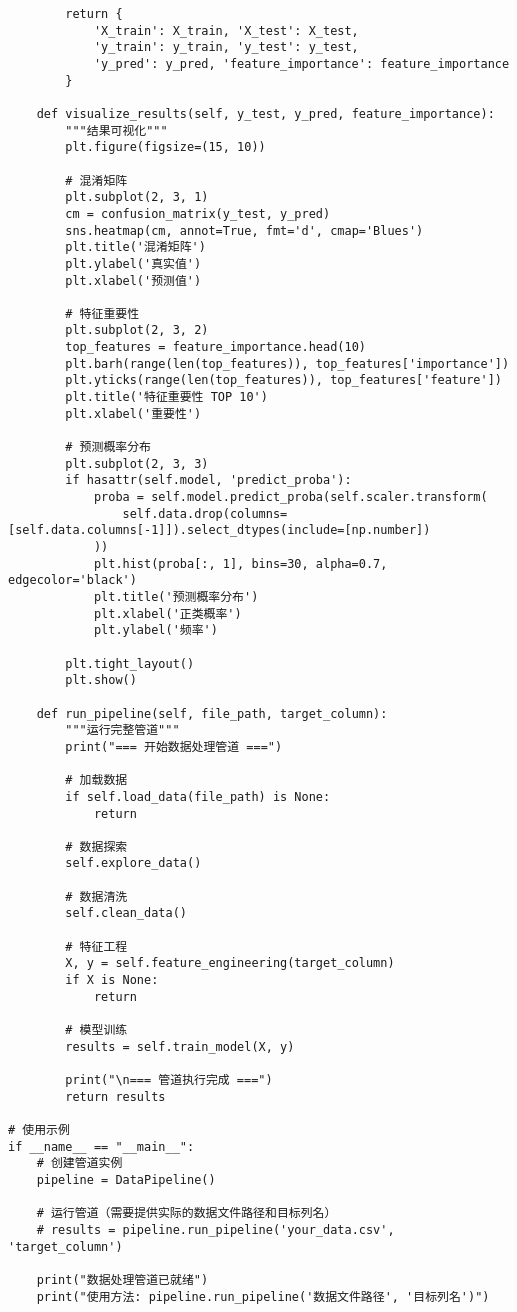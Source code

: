 \begin{codebox}[title=数据处理管道实现]
\begin{verbatim}
        return {
            'X_train': X_train, 'X_test': X_test,
            'y_train': y_train, 'y_test': y_test,
            'y_pred': y_pred, 'feature_importance': feature_importance
        }
    
    def visualize_results(self, y_test, y_pred, feature_importance):
        """结果可视化"""
        plt.figure(figsize=(15, 10))
        
        # 混淆矩阵
        plt.subplot(2, 3, 1)
        cm = confusion_matrix(y_test, y_pred)
        sns.heatmap(cm, annot=True, fmt='d', cmap='Blues')
        plt.title('混淆矩阵')
        plt.ylabel('真实值')
        plt.xlabel('预测值')
        
        # 特征重要性
        plt.subplot(2, 3, 2)
        top_features = feature_importance.head(10)
        plt.barh(range(len(top_features)), top_features['importance'])
        plt.yticks(range(len(top_features)), top_features['feature'])
        plt.title('特征重要性 TOP 10')
        plt.xlabel('重要性')
        
        # 预测概率分布
        plt.subplot(2, 3, 3)
        if hasattr(self.model, 'predict_proba'):
            proba = self.model.predict_proba(self.scaler.transform(
                self.data.drop(columns=[self.data.columns[-1]]).select_dtypes(include=[np.number])
            ))
            plt.hist(proba[:, 1], bins=30, alpha=0.7, edgecolor='black')
            plt.title('预测概率分布')
            plt.xlabel('正类概率')
            plt.ylabel('频率')
        
        plt.tight_layout()
        plt.show()
    
    def run_pipeline(self, file_path, target_column):
        """运行完整管道"""
        print("=== 开始数据处理管道 ===")
        
        # 加载数据
        if self.load_data(file_path) is None:
            return
        
        # 数据探索
        self.explore_data()
        
        # 数据清洗
        self.clean_data()
        
        # 特征工程
        X, y = self.feature_engineering(target_column)
        if X is None:
            return
        
        # 模型训练
        results = self.train_model(X, y)
        
        print("\n=== 管道执行完成 ===")
        return results

# 使用示例
if __name__ == "__main__":
    # 创建管道实例
    pipeline = DataPipeline()
    
    # 运行管道（需要提供实际的数据文件路径和目标列名）
    # results = pipeline.run_pipeline('your_data.csv', 'target_column')
    
    print("数据处理管道已就绪")
    print("使用方法: pipeline.run_pipeline('数据文件路径', '目标列名')")
\end{verbatim}
\end{codebox} 